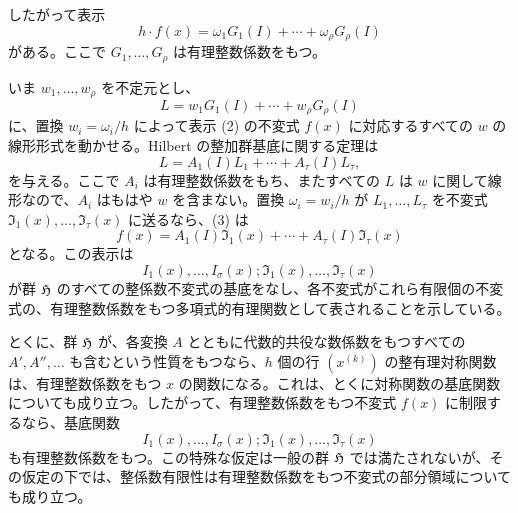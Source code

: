 \documentclass[11pt]{article}
\begin{document}
したがって表示
\begin{equation}
        h\cdot f(x)=\omega_1G_1(I)+\cdots+\omega_\rho G_\rho(I)
\end{equation}
がある。ここで \(G_1,\ldots,G_\rho\) は有理整数係数をもつ。

いま \(w_1,\ldots,w_\rho\) を不定元とし、
\[
        L=w_1G_1(I)+\cdots+w_\rho G_\rho(I)
\]
に、置換 \(w_i=\omega_i/h\) によって表示 (2) の不変式 \(f(x)\) に対応するすべての \(w\) の線形形式を動かせる。Hilbert の整加群基底に関する定理は
\begin{equation}
        L=A_1(I)L_1+\cdots+A_\tau(I)L_\tau,
\end{equation}
を与える。ここで \(A_i\) は有理整数係数をもち、またすべての \(L\) は \(w\) に関して線形なので、\(A_i\) はもはや \(w\) を含まない。置換 \(\omega_i=w_i/h\) が \(L_1,\ldots,L_\tau\) を不変式 \(\mathfrak I_1(x),\ldots,\mathfrak I_\tau(x)\) に送るなら、(3) は
\begin{equation}
        f(x)=A_1(I)\mathfrak I_1(x)+\cdots+A_\tau(I)\mathfrak I_\tau(x)
\end{equation}
となる。この表示は
\[
        I_1(x),\ldots,I_\sigma(x);\mathfrak I_1(x),\ldots,\mathfrak I_\tau(x)
\]
が群 \(\mathfrak H\) のすべての整係数不変式の基底をなし、各不変式がこれら有限個の不変式の、有理整数係数をもつ多項式的有理関数として表されることを示している。

とくに、群 \(\mathfrak H\) が、各変換 \(A\) とともに代数的共役な数係数をもつすべての \(A',A'',\ldots\) も含むという性質をもつなら、\(h\) 個の行 \((x^{(k)})\) の整有理対称関数は、有理整数係数をもつ \(x\) の関数になる。これは、とくに対称関数の基底関数についても成り立つ。したがって、有理整数係数をもつ不変式 \(f(x)\) に制限するなら、基底関数
\[
        I_1(x),\ldots,I_\sigma(x);\mathfrak I_1(x),\ldots,\mathfrak I_\tau(x)
\]
も有理整数係数をもつ。この特殊な仮定は一般の群 \(\mathfrak H\) では満たされないが、その仮定の下では、整係数有限性は有理整数係数をもつ不変式の部分領域についても成り立つ。
\end{document}
